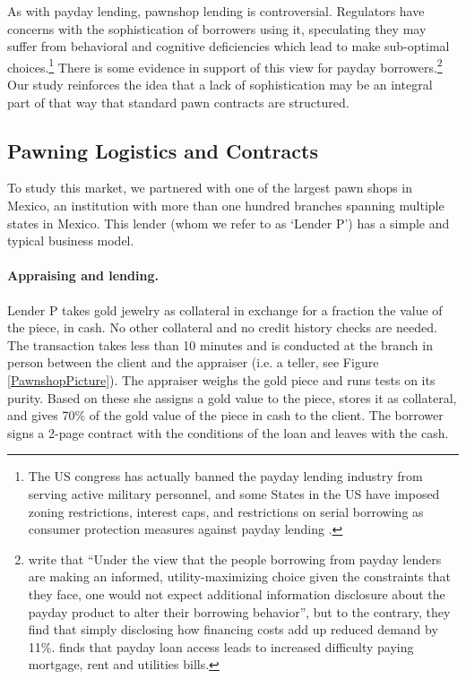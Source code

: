 \documentclass[oneside,11pt]{article}
\begin{document}
As with payday lending, pawnshop lending is controversial. Regulators have concerns with the sophistication of borrowers using it, speculating they may suffer from behavioral and cognitive deficiencies which lead to make sub-optimal choices.\footnote{The US congress has actually banned the payday lending industry from serving active military personnel, and some States in the US have imposed zoning restrictions, interest caps, and restrictions on serial borrowing as consumer protection measures against payday lending \citep{Payday}.} There is some evidence in support of this view for payday borrowers.\footnote{\cite{Bertrand} write that ``Under the view that the people borrowing from payday lenders are making an informed, utility-maximizing choice given the constraints that they face, one would not expect additional information disclosure about the payday product to alter their borrowing behavior'', but to the contrary, they find that simply disclosing how financing costs add up reduced demand by 11\%. \cite{Meltzer} finds that payday loan access leads to increased difficulty paying mortgage, rent and utilities bills.}  Our study reinforces the idea that a lack of sophistication may be an integral part of that way that standard pawn contracts are structured.



\subsection{Pawning Logistics and Contracts}

To study this market, we partnered with one of the largest pawn shops in Mexico, an institution with more than one hundred branches spanning multiple states in Mexico. This lender (whom we refer to as `Lender P') has a simple and typical business model. 

\paragraph{Appraising and lending.} Lender P takes gold jewelry as collateral in exchange for a fraction the value of the piece, in cash. No other collateral and no credit history checks are needed. The transaction takes less than 10 minutes and is conducted at the branch in person between the client and the appraiser (i.e. a teller, see Figure \ref{PawnshopPicture}). The appraiser weighs the gold piece and runs tests on its purity. Based on these she assigns a gold value to the piece, stores it as collateral, and gives 70\% of the gold value of the piece in cash to the client. The borrower signs a 2-page contract with the conditions of the loan and leaves with the cash.
\end{document}

